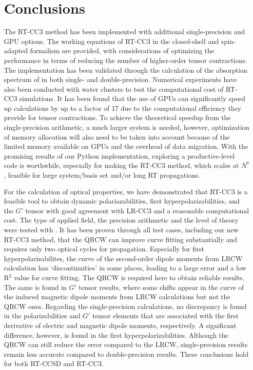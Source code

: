 \section{Conclusions}\label{conc_cc3}
The RT-CC3 method has been implemented with additional single-precision and GPU options. The working equations of RT-CC3 in the closed-shell and spin-adapted formalism are provided, with considerations of optimizing the performance in terms of reducing the number of higher-order tensor contractions. The implementation has been validated through the calculation of the absorption spectrum of  in both single- and double-precision. Numerical experiments have also been conducted with water clusters to test the computational cost of RT-CC3 simulations. It has been found that the use of GPUs can significantly speed up calculations by up to a factor of 17 due to the computational efficiency they provide for tensor contractions. To achieve the theoretical speedup from the single-precision arithmetic, a much larger system is needed, however, optimization of memory allocation will also need to be taken into account because of the limited memory available on GPUs and the overhead of data migration. With the promising results of our Python implementation, exploring a productive-level code is worthwhile, especially for making the RT-CC3 method, which scales at $N^{7}$, feasible for large system/basis set and/or long RT propagations.  

For the calculation of optical properties, we have demonstrated that RT-CC3 is a feasible tool to obtain dynamic polariazabilities, first hyperpolarizabilities, and the $G'$ tensor with good agreement with LR-CC3 and a reasonable computational cost. The type of applied field, the precision arithmetic and the level of theory were tested with . It has been proven through all test cases, including our new RT-CC3 method, that the QRCW can improve curve fitting substantially and requires only two optical cycles for propagation. Especially for first hyperpolarizabilites, the curve of the second-order dipole moments from LRCW calculation has `discontinuities' in some places, leading to a large error and a low R$^{2}$ value for curve fitting. The QRCW is required here to obtain reliable results. The same is found in $G'$ tensor results, where some shifts appear in the curve of the induced magnetic dipole moments from LRCW calculations but not the QRCW ones. Regarding the single-precision calculations, no discrepancy is found in the polarizabilities and $G'$ tensor elements that are associated with the first derivative of electric and magnetic dipole moments, respectively. A significant difference, however, is found in the first hyperpolarizabilities. Although the QRCW can still reduce the error compared to the LRCW, single-precision results remain less accurate compared to double-precision results. These conclusions hold for both RT-CCSD and RT-CC3. 

